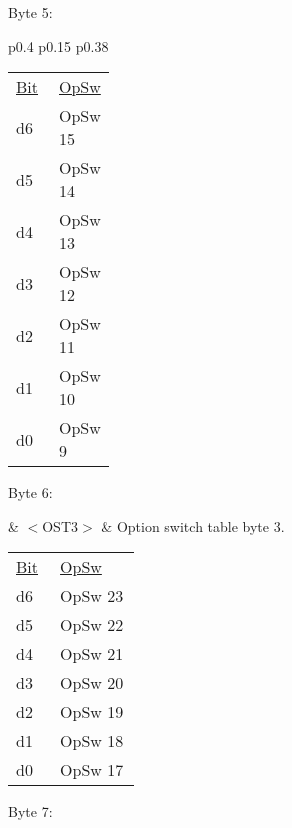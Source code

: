 Byte 5:

\begin{tabular}{p{0.4\linewidth} p{0.15\linewidth} p{0.38\linewidth}} 

\begin{tabular}{|p{0.3cm}|p{0.3cm}|p{0.3cm}|p{0.3cm}|p{0.3cm}|p{0.3cm}|p{0.3cm}|p{0.3cm}|}
\hline
0 & d6 & d5 & d4 & d3 & d2 & d1 & d0\\
\hline
\end{tabular}
& $<$OST2$>$ & Option switch table byte 2.\\
\end{tabular}

\begin{tabular}{p{0.05\linewidth} p{0.2\linewidth} } 
\underline{Bit} & \underline{OpSw} \\
d6 & OpSw 15\\
d5 & OpSw 14\\
d4 & OpSw 13\\
d3 & OpSw 12\\
d2 & OpSw 11\\
d1 & OpSw 10\\
d0 & OpSw 9\\
\end{tabular}

Byte 6:

& $<$OST3$>$ & Option switch table byte 3.\\
\end{tabular}

\begin{tabular}{p{0.05\linewidth} p{0.2\linewidth} } 
\underline{Bit} & \underline{OpSw} \\
d6 & OpSw 23\\
d5 & OpSw 22\\
d4 & OpSw 21\\
d3 & OpSw 20\\
d2 & OpSw 19\\
d1 & OpSw 18\\
d0 & OpSw 17\\
\end{tabular}

Byte 7:

